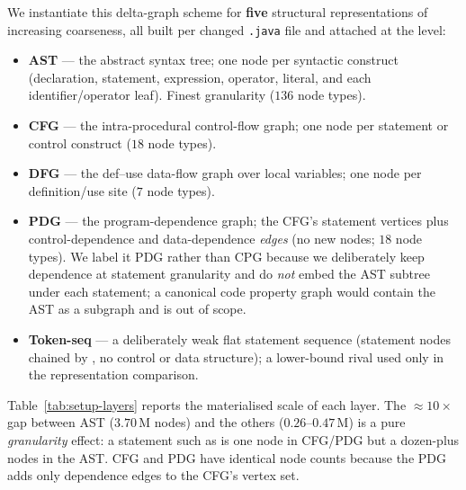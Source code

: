 	We instantiate this delta-graph scheme for \textbf{five} structural representations of
	increasing coarseness, all built per changed \texttt{.java} file and attached at the
	 level:
	\begin{itemize}
		\item \textbf{AST} --- the abstract syntax tree; one node per syntactic construct
		(declaration, statement, expression, operator, literal, and each identifier/operator
		leaf). Finest granularity ($136$ node types).
		\item \textbf{CFG} --- the intra-procedural control-flow graph; one node per statement
		or control construct ($18$ node types).
		\item \textbf{DFG} --- the def--use data-flow graph over local variables; one node per
		definition/use site ($7$ node types).
		\item \textbf{PDG} --- the program-dependence graph; the CFG's statement vertices plus
		control-dependence and data-dependence \emph{edges} (no new nodes; $18$ node types).
		We label it PDG rather than CPG because we deliberately keep dependence at statement
		granularity and do \emph{not} embed the AST subtree under each statement; a canonical
		code property graph would contain the AST as a subgraph and is out of scope.
		\item \textbf{Token-seq} --- a deliberately weak flat statement sequence (statement
		nodes chained by , no control or data structure); a lower-bound rival used
		only in the representation comparison.
	\end{itemize}
	Table~\ref{tab:setup-layers} reports the materialised scale of each layer. The
	${\approx}10\times$ gap between AST ($3.70$\,M nodes) and the others ($0.26$--$0.47$\,M)
	is a pure \emph{granularity} effect: a statement such as  is
	one node in CFG/PDG but a dozen-plus nodes in the AST. CFG and PDG have identical node
	counts because the PDG adds only dependence edges to the CFG's vertex set.
	
